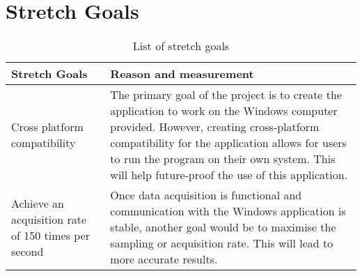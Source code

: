 \documentclass[12pt, titlepage]{article}
\begin{document}
\section{Stretch Goals} %
\begin{table}[h!]
    \centering
    \begin{tabular}{p{} p{}}
    
    \toprule
    \textbf{Stretch Goals} & \textbf{Reason and measurement}\\
   
    \midrule{Cross platform compatibility} & The primary goal of the project is to create the application to work on the Windows computer provided. However, creating cross-platform compatibility for the application allows for users to run the program on their own system. This will help future-proof the use of this application.\\
    \midrule{Achieve an acquisition rate of 150 times per second} & Once data acquisition is functional and communication with the Windows application is stable, another goal would be to maximise the sampling or acquisition rate. This will lead to more accurate results. \\
    
    \bottomrule
    
    \end{tabular}
    \caption{List of stretch goals}
\end{table}
\end{document}
